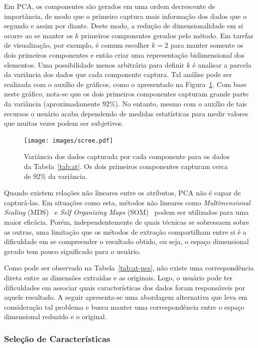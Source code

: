 Em PCA, os componentes são gerados em uma ordem decrescente
de importância, de modo que o primeiro captura mais
informação dos dados que o segundo e assim por diante.
Deste modo, a redução de dimensionalidade em si ocorre ao se
manter os $k$ primeiros componentes gerados pelo método. Em
tarefas de visualização, por exemplo, é comum escolher $k=2$
para manter somente os dois primeiros componentes e então
criar uma representação bidimensional dos elementos. Uma
possibilidade menos arbitrária para definir $k$ é analisar a
parcela da variância dos dados que cada componente captura.
Tal análise pode ser realizada com o auxílio de gráficos,
como o apresentado na Figura~\ref{fig:scree}. Com base neste
gráfico, nota-se que os dois primeiros componentes capturam
grande parte da variância (aproximadamente $92\%$). No
entanto, mesmo com o auxílio de tais recursos o usuário
acaba dependendo de medidas estatísticas para medir valores
que muitas vezes podem ser subjetivos.

\begin{figure}[h!]
    \centering
    \texttt{[image: images/scree.pdf]}
    \caption[Variância capturada pelos PCs]
        {Variância dos dados capturada por cada componente
        para os dados da Tabela~\ref{tab:at}. Os
        dois primeiros componentes capturam cerca de $92\%$
        da variância.}
    \label{fig:scree}
\end{figure}

Quando existem relações não lineares entre os atributos, PCA
não é capaz de capturá-las. Em situações como esta, métodos
não lineares como \textit{Multimensional Scaling}
(MDS)~\cite{Cox2002} e \textit{Self Organizing Maps}
(SOM)~\cite{Kohonen1990} podem ser utilizados para uma maior
eficácia. Porém, independentemente de quais técnicas se
sobressaem sobre as outras, uma limitação que os métodos de
extração compartilham entre si é a dificuldade em se
compreender o resultado obtido, ou seja, o espaço
dimensional gerado tem pouco significado para o usuário. 

Como pode ser observado na Tabela~\ref{tab:at-pcs}, não
existe uma correspondência direta entre as dimensões
extraídas e as originais. Logo, o usuário pode ter
dificuldades em associar quais características dos dados
foram responsáveis por aquele resultado. A seguir
apresenta-se uma abordagem alternativa que leva em
consideração tal problema e busca manter uma correspondência
entre o espaço dimensional reduzido e o original.

\subsubsection{Seleção de Características} 

